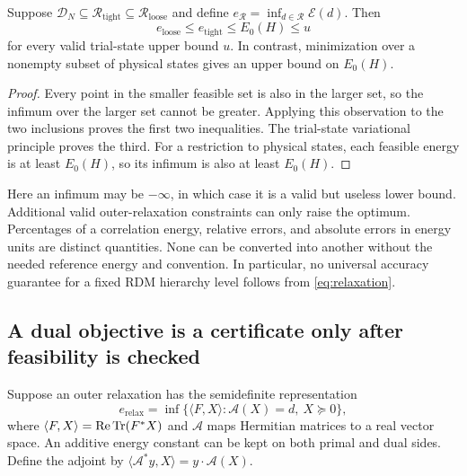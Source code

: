 \begin{proposition}
\label{prop:relaxation}
Suppose
$\mathcal D_N\subseteq\mathcal R_{\mathrm{tight}}
\subseteq\mathcal R_{\mathrm{loose}}$ and define
$e_{\mathcal R}=\inf_{d\in\mathcal R}\mathcal E(d)$.
Then
\begin{equation}
 e_{\mathrm{loose}}\le e_{\mathrm{tight}}\le E_0(H)\le u
 \label{eq:relaxation}
\end{equation}
for every valid trial-state upper bound $u$.
In contrast, minimization over a nonempty subset of physical states gives an
upper bound on $E_0(H)$.
\end{proposition}
\begin{proof}
Every point in the smaller feasible set is also in the larger set, so the
infimum over the larger set cannot be greater. Applying this observation to
the two inclusions proves the first two inequalities. The trial-state
variational principle proves the third. For a restriction to physical
states, each feasible energy is at least $E_0(H)$, so its infimum is also
at least $E_0(H)$.
\end{proof}

Here an infimum may be $-\infty$, in which case it is a valid but useless
lower bound. Additional valid outer-relaxation constraints can only raise
the optimum. Percentages of a correlation energy, relative errors, and
absolute errors in energy units are distinct quantities. None can be
converted into another without the needed reference energy and convention.
In particular, no universal accuracy guarantee for a fixed RDM hierarchy
level follows from \eqref{eq:relaxation}.

\subsection{A dual objective is a certificate only after feasibility is checked}
Suppose an outer relaxation has the semidefinite representation
\begin{equation}
 e_{\mathrm{relax}}=
 \inf\{\langle F,X\rangle:\mathcal A(X)=d,\ X\succeq0\},
 \label{eq:sdp-primal}
\end{equation}
where $\langle F,X\rangle=\operatorname{Re}\operatorname{Tr}(F^*X)$ and
$\mathcal A$ maps Hermitian matrices to a real vector space. An additive
energy constant can be kept on both primal and dual sides. Define the
adjoint by $\langle\mathcal A^*y,X\rangle=y\cdot\mathcal A(X)$.


